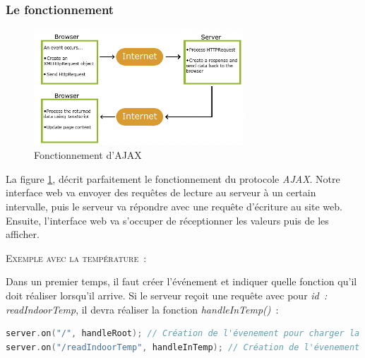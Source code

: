             \subsubsection{Le fonctionnement}

                \begin{figure}[!h]
                    \begin{center}
                        \includegraphics[width=0.7\textwidth]{img/code/AJAX.png}
                        \caption{\label{fig:AJAX}Fonctionnement d'AJAX}  
                    \end{center}
                \end{figure}

                La figure \ref{fig:AJAX}, décrit parfaitement le fonctionnement du protocole \textit{AJAX}. Notre interface web va envoyer des requêtes de lecture au serveur à un certain intervalle, puis le serveur va répondre avec une requête d'écriture au 
                site web. Ensuite, l'interface web va s'occuper de réceptionner les valeurs puis de les afficher. \\
                
                \vspace{.5 cm}

                \noindent
                \textsc{Exemple avec la température~:}

                \vspace{.2 cm}
                
                Dans un premier temps, il faut créer l'événement et indiquer quelle fonction qu’il doit réaliser lorsqu'il arrive. Si le serveur reçoit une requête avec pour \textit{id~: readIndoorTemp}, il devra réaliser la fonction \textit{handleInTemp()}~: 

\begin{lstlisting}[style=myC, caption=Requête réalisée par l'interface web, language=C, frame=lines]
server.on("/", handleRoot); // Création de l'évenement pour charger la page html
server.on("/readIndoorTemp", handleInTemp); // Création de l'évenement pour charger la temp intérieur
\end{lstlisting}


